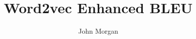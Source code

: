 \documentclass[final]{beamer}
\title[Word2vec BLEU]{Word2vec Enhanced BLEU}
\author[Morgan]{John Morgan}
\institute[UMD]{University of Maryland}
\date{}
\begin{document}
\begin{frame}{}
\vfill
\begin{beamercolorbox}{}
\maketitle
\end{beamercolorbox}
  \vskip 0.1in
\begin{columns}[t]
\begin{column}{.45\linewidth}


\end{column}
\begin{column}{.45\linewidth}



%
\end{column}
\end{columns}
\end{frame}
\end{document}
